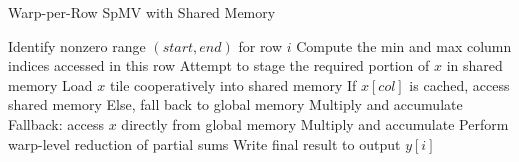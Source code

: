 \documentclass[conference]{IEEEtran}
\begin{document}
\begin{algorithm*}[ht]
    \caption{Warp-per-Row SpMV with Shared Memory}
    \label{wpr_opt}
    \begin{algorithmic}[1]
            \State Identify nonzero range $(start, end)$ for row $i$
            \State Compute the min and max column indices accessed in this row
            \State Attempt to stage the required portion of $x$ in shared memory
                \State Load $x$ tile cooperatively into shared memory
                    \State If $x[col]$ is cached, access shared memory
                    \State Else, fall back to global memory
                    \State Multiply and accumulate
                \EndFor
            \Else
                \State Fallback: access $x$ directly from global memory
                    \State Multiply and accumulate
                \EndFor
            \EndIf
            \State Perform warp-level reduction of partial sums
            \State Write final result to output $y[i]$
        \EndFor
    \EndProcedure
    \end{algorithmic}
\end{algorithm*}
\end{document}
